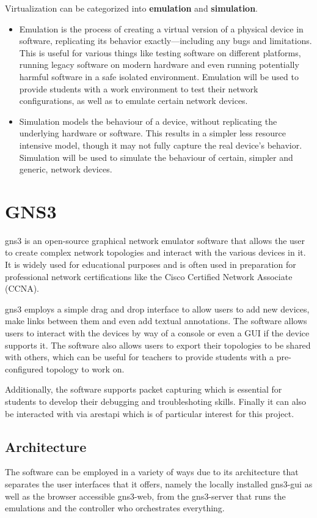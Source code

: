 Virtualization can be categorized into \textbf{emulation} and \textbf{simulation}. 

\begin{itemize}
  \item Emulation is the process of creating a virtual version of a physical device in software, replicating its 
  behavior exactly—including any bugs and limitations. This is useful for various things like testing software on 
  different platforms, running legacy software on modern hardware and even running potentially harmful software in a safe 
  isolated environment.
  Emulation will be used to provide students with a work environment to test their network configurations,
  as well as to emulate certain network devices.
  \item Simulation models the behaviour of a device, without replicating the underlying hardware or software.
  This results in a simpler less resource intensive model, though it may not fully capture the real device's behavior.
  Simulation will be used to simulate the behaviour of certain, simpler and generic, network devices.

\end{itemize}


\section{GNS3}
\ac{gns3} is an open-source graphical network emulator software that allows the user to create complex network topologies 
and interact with the various devices in it. It is widely used for educational purposes and is often used in preparation 
for professional network certifications like the Cisco Certified Network Associate (CCNA).

\ac{gns3} employs a simple drag and drop interface to allow users to add new devices, make links between them 
and even add textual annotations. The software allows users to interact with the devices by way of a console or even a GUI
if the device supports it. The software also allows users to export their topologies to be shared with others, which can
be useful for teachers to provide students with a pre-configured topology to work on.

Additionally, the software supports packet capturing which is essential for students to develop their debugging and 
troubleshoting skills. Finally it can also be interacted with via a\ac{rest}\ac{api} which is of particular interest
for this project.

\subsection{Architecture}
The software can be employed in a variety of ways due to its architecture \cite{GNS3Architecture} that separates the user 
interfaces that it offers, namely the locally installed gns3-gui as well as the browser accessible gns3-web, from the 
gns3-server that runs the emulations and the controller who orchestrates everything.

